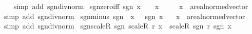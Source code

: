 \begin{isabellebody}
%
\isadelimproof
\ \ %
\endisadelimproof
%
\isatagproof
{}\isamarkupfalse%
\ {\isacharparenleft}{\kern0pt}simp\ add{\isacharcolon}{\kern0pt}\ sgn{\isacharunderscore}{\kern0pt}div{\isacharunderscore}{\kern0pt}norm{\isacharparenright}{\kern0pt}%
\endisatagproof
{\isafoldproof}%
%
\isadelimproof
\isanewline
%
\endisadelimproof
\isanewline
{}\isamarkupfalse%
\ sgn{\isacharunderscore}{\kern0pt}zero{\isacharunderscore}{\kern0pt}iff{\isacharcolon}{\kern0pt}\ {\isachardoublequoteopen}sgn\ x\ {\isacharequal}{\kern0pt}\ {}\ {\isasymlongleftrightarrow}\ x\ {\isacharequal}{\kern0pt}\ {}{\isachardoublequoteclose}\isanewline
\ \ \ x\ {\isacharcolon}{\kern0pt}{\isacharcolon}{\kern0pt}\ {\isachardoublequoteopen}{\isacharprime}{\kern0pt}a{\isacharcolon}{\kern0pt}{\isacharcolon}{\kern0pt}real{\isacharunderscore}{\kern0pt}normed{\isacharunderscore}{\kern0pt}vector{\isachardoublequoteclose}\isanewline
%
\isadelimproof
\ \ %
\endisadelimproof
%
\isatagproof
{}\isamarkupfalse%
\ {\isacharparenleft}{\kern0pt}simp\ add{\isacharcolon}{\kern0pt}\ sgn{\isacharunderscore}{\kern0pt}div{\isacharunderscore}{\kern0pt}norm{\isacharparenright}{\kern0pt}%
\endisatagproof
{\isafoldproof}%
%
\isadelimproof
\isanewline
%
\endisadelimproof
\isanewline
{}\isamarkupfalse%
\ sgn{\isacharunderscore}{\kern0pt}minus{\isacharcolon}{\kern0pt}\ {\isachardoublequoteopen}sgn\ {\isacharparenleft}{\kern0pt}{\isacharminus}{\kern0pt}\ x{\isacharparenright}{\kern0pt}\ {\isacharequal}{\kern0pt}\ {\isacharminus}{\kern0pt}\ sgn\ x{\isachardoublequoteclose}\isanewline
\ \ \ x\ {\isacharcolon}{\kern0pt}{\isacharcolon}{\kern0pt}\ {\isachardoublequoteopen}{\isacharprime}{\kern0pt}a{\isacharcolon}{\kern0pt}{\isacharcolon}{\kern0pt}real{\isacharunderscore}{\kern0pt}normed{\isacharunderscore}{\kern0pt}vector{\isachardoublequoteclose}\isanewline
%
\isadelimproof
\ \ %
\endisadelimproof
%
\isatagproof
{}\isamarkupfalse%
\ {\isacharparenleft}{\kern0pt}simp\ add{\isacharcolon}{\kern0pt}\ sgn{\isacharunderscore}{\kern0pt}div{\isacharunderscore}{\kern0pt}norm{\isacharparenright}{\kern0pt}%
\endisatagproof
{\isafoldproof}%
%
\isadelimproof
\isanewline
%
\endisadelimproof
\isanewline
{}\isamarkupfalse%
\ sgn{\isacharunderscore}{\kern0pt}scaleR{\isacharcolon}{\kern0pt}\ {\isachardoublequoteopen}sgn\ {\isacharparenleft}{\kern0pt}scaleR\ r\ x{\isacharparenright}{\kern0pt}\ {\isacharequal}{\kern0pt}\ scaleR\ {\isacharparenleft}{\kern0pt}sgn\ r{\isacharparenright}{\kern0pt}\ {\isacharparenleft}{\kern0pt}sgn\ x{\isacharparenright}{\kern0pt}{\isachardoublequoteclose}\isanewline

\end{isabellebody}
